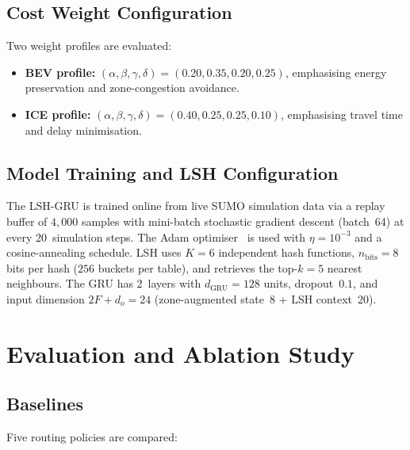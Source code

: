 \documentclass[journal,letterpaper,10pt]{IEEEtran}
\theoremstyle{definition}
\theoremstyle{remark}
\begin{document}
\subsection{Cost Weight Configuration}

Two weight profiles are evaluated:
\begin{itemize}
  \item \textbf{BEV profile:}
        $(\alpha,\beta,\gamma,\delta)=(0.20,0.35,0.20,0.25)$,
        emphasising energy preservation and zone-congestion
        avoidance.
  \item \textbf{ICE profile:}
        $(\alpha,\beta,\gamma,\delta)=(0.40,0.25,0.25,0.10)$,
        emphasising travel time and delay minimisation.
\end{itemize}

\subsection{Model Training and LSH Configuration}

The LSH-GRU is trained online from live SUMO simulation data via
a replay buffer of $4{,}000$ samples with mini-batch stochastic
gradient descent (batch~64) at every 20~simulation steps.
The Adam optimiser~\cite{kingma2015adam} is used with
$\eta=10^{-3}$ and a cosine-annealing schedule.
LSH uses $K=6$ independent hash functions, $n_{\mathrm{bits}}=8$
bits per hash ($256$ buckets per table), and retrieves the top-$k=5$
nearest neighbours.  The GRU has 2~layers with
$d_{\mathrm{GRU}}=128$ units, dropout~$0.1$, and input dimension
$2F+d_o=24$ (zone-augmented state~$8$ + LSH context~$20$).

\section{Evaluation and Ablation Study}
\label{sec:eval}

\subsection{Baselines}

Five routing policies are compared:
\end{document}
